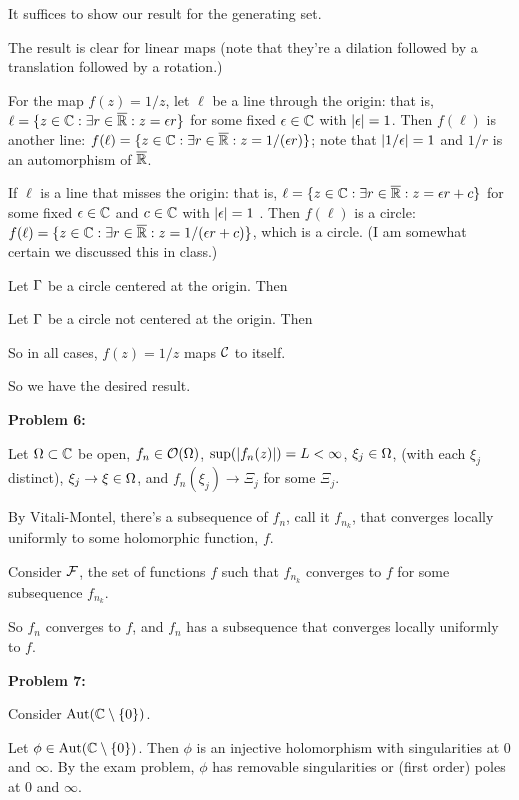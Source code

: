 \documentclass[a4paper,12pt]{article}
\begin{document}
It suffices to show our result for the generating set.

The result is clear for linear maps (note that they're a dilation followed by a translation followed by a rotation.) 

For the map $f(z) = 1/z$, let $\ell$ be a line through the origin: that is, $\ell = \{z \in \mathbb{C}: \exists r \in \overline{\mathbb{R}}: z=\epsilon r\}$ for some fixed $\epsilon \in \mathbb{C}$ with $\left\lvert \epsilon \right\rvert = 1$. Then $f(\ell)$ is another line: $f(\ell) = \{z \in \mathbb{C}: \exists r \in \overline{\mathbb{R}}: z=1/(\epsilon r)\}$; note that $\left\lvert 1/\epsilon \right\rvert = 1$ and $1/r$ is an automorphism of $\overline{\mathbb{R}}$. 

If $\ell$ is a line that misses the origin: that is, $\ell = \{z \in \mathbb{C}: \exists r \in \overline{\mathbb{R}}: z=\epsilon r+ c\}$ for some fixed $\epsilon \in \mathbb{C}$ and $c \in \mathbb{C}$ with $\left\lvert \epsilon \right\rvert = 1$ . Then $f(\ell)$ is a circle: $f(\ell) = \{z \in \mathbb{C}: \exists r \in \overline{\mathbb{R}}: z = 1/(\epsilon r + c)\}$, which is a circle. (I am somewhat certain we discussed this in class.)  

Let $\Gamma$ be a circle centered at the origin. Then %

Let $\Gamma$ be a circle not centered at the origin. Then %

So in all cases, $f(z) = 1/z$ maps $\mathcal{C}$ to itself.

So we have the desired result. 

\shunt

{\bf Problem 6:}

Let $\Omega \subset \mathbb{C}$ be open, $f_n \in \mathcal{O}(\Omega)$, $\sup(\left\lvert f_n(z) \right\rvert) = L < \infty$, $\xi_j \in \Omega$, (with each $\xi_j$ distinct), $\xi_j \to \xi \in \Omega$, and $f_n(\xi_j) \to \Xi_j$ for some $\Xi_j$.

By Vitali-Montel, there's a subsequence of $f_n$, call it $f_{n_k}$, that converges locally uniformly to some holomorphic function, $f$.

Consider $\mathcal{F}$, the set of functions $f$ such that $f_{n_k}$ converges to $f$ for some subsequence $f_{n_k}$. %

So $f_n$ converges to $f$, and $f_n$ has a subsequence that converges locally uniformly to $f$. %

\shunt

{\bf Problem 7:}

Consider $\text{Aut}(\mathbb{C} \setminus \{0\})$.

Let $\phi \in \text{Aut}(\mathbb{C} \setminus \{0\})$. Then $\phi$ is an injective holomorphism with singularities at $0$ and $\infty$. By the exam problem, $\phi$ has removable singularities or (first order) poles at $0$ and $\infty$.
\end{document}
